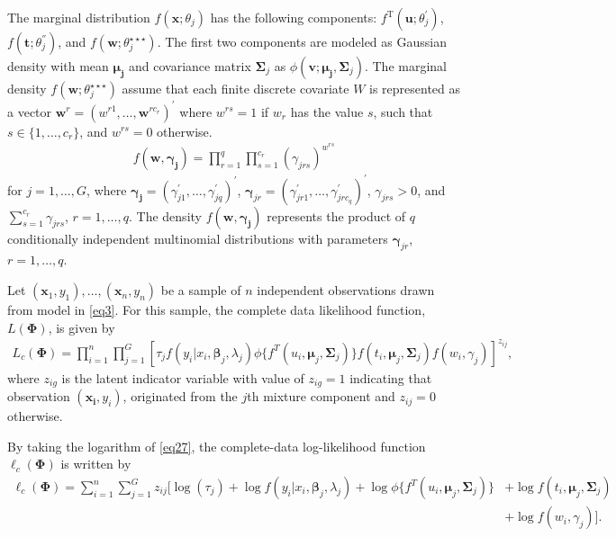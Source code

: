 \documentclass[11pt,letterpaper]{article}
\numberwithin{equation}{section}
\numberwithin{equation}{section}
\numberwithin{equation}{section}
\begin{document}
The marginal distribution $f(\bm{x};\theta_j)$ has the following components: $f^{\text{T}}(\bm{u};\theta_j^{'})$, $f(\bm{t};\theta_j^{''})$, and $f(\bm{w};\theta_{j}^{\star\star\star})$. The first two components are modeled as Gaussian density with mean $\bm {\mu_j}$ and covariance matrix $\bm \Sigma_j$ as $\phi(\bm v; \bm {\mu_j}, \bm \Sigma_j)$. The marginal density $f(\bm{w};\theta_{j}^{\star\star\star})$ assume that each finite discrete covariate $W$ is represented as a vector $\bm{w}^r=(w^{r1},\ldots,\bm{w}^{rc_r})^{'}$ where $w^{rs}=1$ if $w_r$ has the value $s$, such that $s\in\{1, \ldots, c_r\}$, %
and $w^{rs}=0$ otherwise.
\begin{align}
f(\bm {w}, \bm {\gamma_j})=\prod_{r=1}^{q}\prod_{s=1}^{c_r}(\gamma_{jrs} )^{w^{rs}} 
\label{eq31}
\end{align}
for $j=1, \ldots, G$, where $\bm {\gamma_j}=(\gamma_{j1}^{'}, \ldots, \gamma_{jq}^{'})^{'}$, $\bm \gamma_{jr}=(\gamma_{jr1}^{'}, \ldots, \gamma_{jrc_q}^{'})^{'}$, $\gamma_{jrs} > 0$, and  $\sum_{s=1}^{c_r}\gamma_{jrs}$, $r=1,\ldots,q$. The density $f(\bm {w}, \bm{\gamma_j})$ represents the product of $q$ conditionally independent multinomial distributions with parameters $\bm{\gamma}_{jr}$, $r=1,\ldots, q$.

Let $(\bm x_1, y_1),\ldots, (\bm x_n, y_n)$ be a sample of $n$ independent observations drawn from model in \eqref{eq3}.
For this sample, the complete data likelihood function, $L(\bm\Phi)$, is given by
\begin{align}
L_c(\bm\Phi)=\prod_{i=1}^{n}\prod_{j=1}^{G}\left[{\tau_j}f(y_i|x_i, \bm \beta_j, \lambda_{j})\phi\{f^T(u_i, \bm\mu_j, \bm\Sigma_j)\}f(t_i, \bm\mu_j, \bm\Sigma_j) f(w_i, \gamma_j) \right]^{z_{ij}},
\label{eq27}
\end{align}
where $z_{ig}$ is the latent indicator variable with value of $z_{ig}=1$ indicating that observation $(\bm{x_i}, y_i)$, originated from the $j$th mixture component and $z_{ij}=0$ otherwise.

By taking the logarithm of \eqref{eq27}, the complete-data log-likelihood function $\ell_c(\bm\Phi)$ is written by
\begin{equation*}\begin{split}
\ell_c(\bm\Phi)= \sum_{i=1}^{n}\sum_{j=1}^{G}{z_{ij}}\big[\log(\tau_{j}) + \log{f}(y_i|x_i,\bm \beta_j,\lambda_j)+ \log \phi\{f^T(u_i, \bm\mu_j, \bm\Sigma_j)\}& + \log f(t_i, \bm\mu_j, \bm\Sigma_j)\\& +\log {f}(w_i, \gamma_j)\big].
\label{eq28}
\end{split}\end{equation*}
\end{document}
